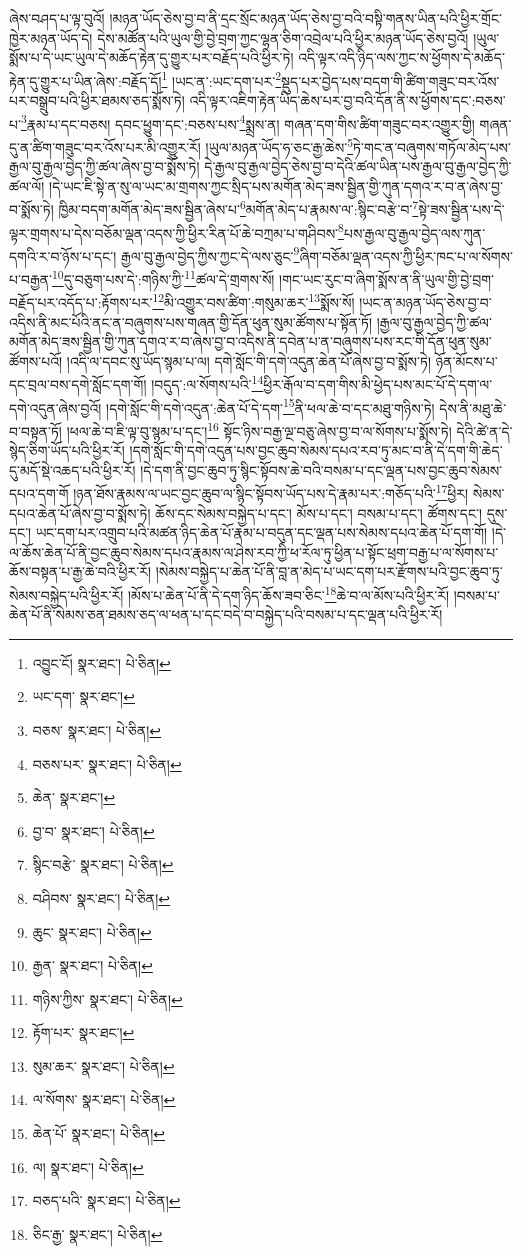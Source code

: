 ཞེས་བཤད་པ་ལྟ་བུའོ། །མཉན་ཡོད་ཅེས་བྱ་བ་ནི་དྲང་སྲོང་མཉན་ཡོད་ཅེས་བྱ་བའི་བསྟི་གནས་ཡིན་པའི་ཕྱིར་གྲོང་ཁྱེར་མཉན་ཡོད་དེ། དེས་མཚོན་པའི་ཡུལ་གྱི་བྱེ་བྲག་ཀྱང་ལྷན་ཅིག་འབྲེལ་པའི་ཕྱིར་མཉན་ཡོད་ཅེས་བྱའོ། །ཡུལ་སྨོས་པ་དེ་ཡང་ཡུལ་དེ་མཆོད་རྟེན་དུ་གྱུར་པར་བརྗོད་པའི་ཕྱིར་ཏེ། འདི་ལྟར་འདི་ཉིད་ལས་ཀྱང་ས་ཕྱོགས་དེ་མཆོད་རྟེན་དུ་གྱུར་པ་ཡིན་ཞེས་:བརྗོད་དོ།\footnote{འབྱུང་ངོ།  སྣར་ཐང་།  པེ་ཅིན། } །ཡང་ན་:ཡང་དག་པར་\footnote{ཡང་དག་  སྣར་ཐང་། }སྡུད་པར་བྱེད་པས་བདག་གི་ཚིག་གཟུང་བར་འོས་པར་བསྒྲུབ་པའི་ཕྱིར་ཐམས་ཅད་སྨོས་ཏེ། འདི་ལྟར་འཇིག་རྟེན་ཡིད་ཆེས་པར་བྱ་བའི་དོན་ནི་ས་ཕྱོགས་དང་:བཅས་པ་\footnote{བཅས་  སྣར་ཐང་།  པེ་ཅིན། }རྣམ་པ་དང་བཅས། དབང་ཕྱུག་དང་:བཅས་པས་\footnote{བཅས་པར་  སྣར་ཐང་།  པེ་ཅིན། }སྨྲས་ན། གཞན་དག་གིས་ཚིག་གཟུང་བར་འགྱུར་གྱི། གཞན་དུ་ན་ཚིག་གཟུང་བར་འོས་པར་མི་འགྱུར་རོ། །ཡུལ་མཉན་ཡོད་ཧ་ཅང་རྒྱ་ཆེས་\footnote{ཆེན་  སྣར་ཐང་། }ཏེ་གང་ན་བཞུགས་གཏོལ་མེད་པས་རྒྱལ་བུ་རྒྱལ་བྱེད་ཀྱི་ཚལ་ཞེས་བྱ་བ་སྨོས་ཏེ། དེ་རྒྱལ་བུ་རྒྱལ་བྱེད་ཅེས་བྱ་བ་དེའི་ཚལ་ཡིན་པས་རྒྱལ་བུ་རྒྱལ་བྱེད་ཀྱི་ཚལ་ལོ། །དེ་ཡང་ཇི་སྟེ་ན་སུ་ལ་ཡང་མ་གྲགས་ཀྱང་སྲིད་པས་མགོན་མེད་ཟས་སྦྱིན་གྱི་ཀུན་དགའ་ར་བ་ན་ཞེས་བྱ་བ་སྨོས་ཏེ། ཁྱིམ་བདག་མགོན་མེད་ཟས་སྦྱིན་ཞེས་པ་\footnote{བྱ་བ་  སྣར་ཐང་།  པེ་ཅིན། }མགོན་མེད་པ་རྣམས་ལ་:སྙིང་བརྩེ་བ་\footnote{སྙིང་བརྩེ་  སྣར་ཐང་།  པེ་ཅིན། }སྟེ་ཟས་སྦྱིན་པས་དེ་ལྟར་གྲགས་པ་དེས་བཅོམ་ལྡན་འདས་ཀྱི་ཕྱིར་རིན་པོ་ཆེ་བཀྲམ་པ་གཤིབས་\footnote{བཤིབས་  སྣར་ཐང་།  པེ་ཅིན། }པས་རྒྱལ་བུ་རྒྱལ་བྱེད་ལས་ཀུན་དགའི་ར་བ་ཉོས་པ་དང་། རྒྱལ་བུ་རྒྱལ་བྱེད་ཀྱིས་ཀྱང་དེ་ལས་ཅུང་\footnote{ཆུང་  སྣར་ཐང་།  པེ་ཅིན། }ཞིག་བཅོམ་ལྡན་འདས་ཀྱི་ཕྱིར་ཁང་པ་ལ་སོགས་པ་བརྒྱན་\footnote{རྒྱན་  སྣར་ཐང་།  པེ་ཅིན། }དུ་བཅུག་པས་དེ་:གཉིས་ཀྱི་\footnote{གཉིས་ཀྱིས་  སྣར་ཐང་།  པེ་ཅིན། }ཚལ་དེ་གྲགས་སོ། །གང་ཡང་རུང་བ་ཞིག་སྨོས་ན་ནི་ཡུལ་གྱི་བྱེ་བྲག་བརྗོད་པར་འདོད་པ་:རྟོགས་པར་\footnote{རྟོག་པར་  སྣར་ཐང་། }མི་འགྱུར་བས་ཚིག་:གསུམ་ཆར་\footnote{སུམ་ཆར་  སྣར་ཐང་།  པེ་ཅིན། }སྨོས་སོ། །ཡང་ན་མཉན་ཡོད་ཅེས་བྱ་བ་འདིས་ནི་མང་པོའི་ནང་ན་བཞུགས་པས་གཞན་གྱི་དོན་ཕུན་སུམ་ཚོགས་པ་སྟོན་ཏོ། །རྒྱལ་བུ་རྒྱལ་བྱེད་ཀྱི་ཚལ་མགོན་མེད་ཟས་སྦྱིན་གྱི་ཀུན་དགའ་ར་བ་ཞེས་བྱ་བ་འདིས་ནི་དབེན་པ་ན་བཞུགས་པས་རང་གི་དོན་ཕུན་སུམ་ཚོགས་པའོ། །འདི་ལ་དབང་སུ་ཡོད་སྙམ་པ་ལ། དགེ་སློང་གི་དགེ་འདུན་ཆེན་པོ་ཞེས་བྱ་བ་སྨོས་ཏེ། ཉོན་མོངས་པ་དང་བྲལ་བས་དགེ་སློང་དག་གོ། །བདུད་:ལ་སོགས་པའི་\footnote{ལ་སོགས་  སྣར་ཐང་།  པེ་ཅིན། }ཕྱིར་རྒོལ་བ་དག་གིས་མི་ཕྱེད་པས་མང་པོ་དེ་དག་ལ་དགེ་འདུན་ཞེས་བྱའོ། །དགེ་སློང་གི་དགེ་འདུན་:ཆེན་པོ་དེ་དག་\footnote{ཆེན་པོ་  སྣར་ཐང་།  པེ་ཅིན། }ནི་ཕལ་ཆེ་བ་དང་མཐུ་གཉིས་ཏེ། དེས་ནི་མཐུ་ཆེ་བ་བསྟན་ཏོ། །ཕལ་ཆེ་བ་ཇི་ལྟ་བུ་སྙམ་པ་དང་།\footnote{ལ།  སྣར་ཐང་།  པེ་ཅིན། } སྟོང་ཉིས་བརྒྱ་ལྔ་བཅུ་ཞེས་བྱ་བ་ལ་སོགས་པ་སྨོས་ཏེ། དེའི་ཚེ་ན་དེ་སྙེད་ཅིག་ཡོད་པའི་ཕྱིར་རོ། །དགེ་སློང་གི་དགེ་འདུན་པས་བྱང་ཆུབ་སེམས་དཔའ་རབ་ཏུ་མང་བ་ནི་དེ་དག་གི་ཆེད་དུ་མདོ་སྡེ་འཆད་པའི་ཕྱིར་རོ། །དེ་དག་ནི་བྱང་ཆུབ་ཏུ་སྙིང་སྟོབས་ཆེ་བའི་བསམ་པ་དང་ལྡན་པས་བྱང་ཆུབ་སེམས་དཔའ་དག་གོ །ཉན་ཐོས་རྣམས་ལ་ཡང་བྱང་ཆུབ་ལ་སྙིང་སྟོབས་ཡོད་པས་དེ་རྣམ་པར་:གཅོད་པའི་\footnote{བཅད་པའི་  སྣར་ཐང་།  པེ་ཅིན། }ཕྱིར། སེམས་དཔའ་ཆེན་པོ་ཞེས་བྱ་བ་སྨོས་ཏེ། ཆོས་དང་སེམས་བསྐྱེད་པ་དང་། མོས་པ་དང་། བསམ་པ་དང་། ཚོགས་དང་། དུས་དང་། ཡང་དག་པར་འགྲུབ་པའི་མཚན་ཉིད་ཆེན་པོ་རྣམ་པ་བདུན་དང་ལྡན་པས་སེམས་དཔའ་ཆེན་པོ་དག་གོ། །དེ་ལ་ཆོས་ཆེན་པོ་ནི་བྱང་ཆུབ་སེམས་དཔའ་རྣམས་ལ་ཤེས་རབ་ཀྱི་ཕ་རོལ་ཏུ་ཕྱིན་པ་སྟོང་ཕྲག་བརྒྱ་པ་ལ་སོགས་པ་ཆོས་བསྟན་པ་རྒྱ་ཆེ་བའི་ཕྱིར་རོ། །སེམས་བསྐྱེད་པ་ཆེན་པོ་ནི་བླ་ན་མེད་པ་ཡང་དག་པར་རྫོགས་པའི་བྱང་ཆུབ་ཏུ་སེམས་བསྐྱེད་པའི་ཕྱིར་རོ། །མོས་པ་ཆེན་པོ་ནི་དེ་དག་ཉིད་ཆོས་ཟབ་ཅིང་\footnote{ཅིང་རྒྱ་  སྣར་ཐང་།  པེ་ཅིན། }ཆེ་བ་ལ་མོས་པའི་ཕྱིར་རོ། །བསམ་པ་ཆེན་པོ་ནི་སེམས་ཅན་ཐམས་ཅད་ལ་ཕན་པ་དང་བདེ་བ་བསྐྱེད་པའི་བསམ་པ་དང་ལྡན་པའི་ཕྱིར་རོ། 